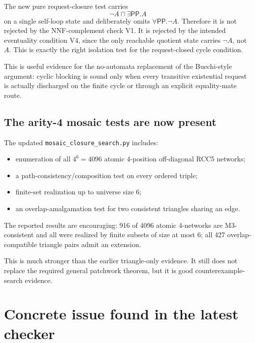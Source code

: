\documentclass[11pt]{article}
\newcommand{\PP}{\mathsf{PP}}
\begin{document}
The new pure request-closure test carries
\[
\neg A \sqcap \exists\PP.A
\]
on a single self-loop state and deliberately omits \(\forall\PP.\neg A\).  Therefore it is not rejected by the NNF-complement check V1.  It is rejected by the intended eventuality condition V4, since the only reachable quotient state carries \(\neg A\), not \(A\).  This is exactly the right isolation test for the request-closed cycle condition.

This is useful evidence for the no-automata replacement of the Buechi-style argument: cyclic blocking is sound only when every transitive existential request is actually discharged on the finite cycle or through an explicit equality-mate route.

\subsection{The arity-4 mosaic tests are now present}

The updated \texttt{mosaic\_closure\_search.py} includes:
\begin{itemize}[leftmargin=2em]
  \item enumeration of all \(4^6=4096\) atomic 4-position off-diagonal RCC5 networks;
  \item a path-consistency/composition test on every ordered triple;
  \item finite-set realization up to universe size 6;
  \item an overlap-amalgamation test for two consistent triangles sharing an edge.
\end{itemize}
The reported results are encouraging: 916 of 4096 atomic 4-networks are M3-consistent and all were realized by finite subsets of size at most 6; all 427 overlap-compatible triangle pairs admit an extension.

This is much stronger than the earlier triangle-only evidence.  It still does not replace the required general patchwork theorem, but it is good counterexample-search evidence.

\section{Concrete issue found in the latest checker}
\end{document}
